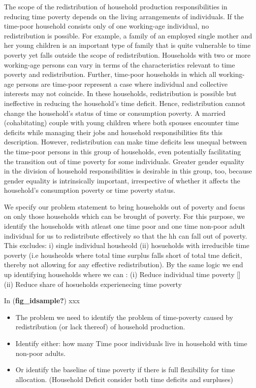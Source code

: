 \documentclass[
  11pt,
]{article}
\providecommand{\tightlist}{%
  \setlength{\itemsep}{0pt}\setlength{\parskip}{0pt}}\usepackage{longtable,booktabs,array}
\begin{document}
The scope of the redistribution of household production responsibilities
in reducing time poverty depends on the living arrangements of
individuals. If the time-poor household consists only of one working-age
individual, no redistribution is possible. For example, a family of an
employed single mother and her young children is an important type of
family that is quite vulnerable to time poverty yet falls outside the
scope of redistribution. Households with two or more working-age persons
can vary in terms of the characteristics relevant to time poverty and
redistribution. Further, time-poor households in which all working-age
persons are time-poor represent a case where individual and collective
interests may not coincide. In these households, redistribution is
possible but ineffective in reducing the household's time deficit.
Hence, redistribution cannot change the household's status of time or
consumption poverty. A married (cohabitating) couple with young children
where both spouses encounter time deficits while managing their jobs and
household responsibilities fits this description. However,
redistribution can make time deficits less unequal between the time-poor
persons in this group of households, even potentially facilitating the
transition out of time poverty for some individuals. Greater gender
equality in the division of household responsibilities is desirable in
this group, too, because gender equality is intrinsically important,
irrespective of whether it affects the household's consumption poverty
or time poverty status.

We specify our problem statement to bring households out of poverty and
focus on only those households which can be brought of poverty. For this
purpose, we identify the households with atleast one time poor and one
time non-poor adult individual for us to redistribute effectively so
that the hh can fall out of poverty. This excludes: i) single individual
housheold (ii) hosueholds with irreducible time poverty (i.e housheolds
where total time surplus falls short of total tme deficit, thereby not
allowing for any effective redistribution). By the same logic we end up
identifying households where we can : (i) Reduce individual time poverty
{[}{]} (ii) Reduce share of hosueholds experienecing time poverty

In (\textbf{fig\_idsample?}) xxx

\begin{itemize}
\tightlist
\item
  The problem we need to identify the problem of time-poverty caused by
  redistribution (or lack thereof) of household production.
\item
  Identify either: how many Time poor individuals live in household with
  time non-poor adults.
\item
  Or identify the baseline of time poverty if there is full flexibility
  for time allocation. (Household Deficit consider both time deficits
  and surpluses)
\end{itemize}
\end{document}
